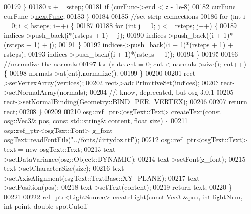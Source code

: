 \begin{DoxyCode}
00179             \}
00180             z += zstep;
00181             \textcolor{keywordflow}{if} (curFunc->\hyperlink{structbrtr_1_1_body_of_rotation_function_a46667ab72bfeddc305bf31fa359c8699}{end} < z - 1e-8)
00182                 curFunc = curFunc->\hyperlink{structbrtr_1_1_body_of_rotation_function_ad7df29eaeb2504928488691196cc06eb}{nextFunc};
00183         \}
00184 
00185         \textcolor{comment}{//set strip connections}
00186         \textcolor{keywordflow}{for} (\textcolor{keywordtype}{int} i = 0; i < hsteps; i++) \{
00187 
00188             \textcolor{keywordflow}{for} (\textcolor{keywordtype}{int} j = 0; j <= rsteps; j++) \{
00189                 indices->push\_back(i*(rsteps + 1) + j);
00190                 indices->push\_back((i + 1)*(rsteps + 1) + j);
00191             \}
00192             indices->push\_back((i + 1)*(rsteps + 1) + rsteps);
00193             indices->push\_back((i + 1)*(rsteps + 1));
00194         \}
00195 
00196         \textcolor{comment}{//normalize the normals}
00197         \textcolor{keywordflow}{for} (\textcolor{keyword}{auto} cnt = 0; cnt < normals->size(); cnt++) \{
00198             normals->at(cnt).normalize();
00199         \}
00200 
00201         rect->setVertexArray(vertices);
00202         rect->addPrimitiveSet(indices);
00203         rect->setNormalArray(normals);
00204         \textcolor{comment}{//i know, deprecated, but osg 3.0.1}
00205         rect->setNormalBinding(Geometry::BIND\_PER\_VERTEX);
00206 
00207         \textcolor{keywordflow}{return} rect;
00208     \}
00209 
\hypertarget{_util_functions_8cpp_source_l00210}{}\hyperlink{namespacebrtr_a4431de1c1fa2c1d42c4fb57c38aaa3ce}{00210}     osg::ref\_ptr<osgText::Text> \hyperlink{namespacebrtr_a4431de1c1fa2c1d42c4fb57c38aaa3ce}{createText}(\textcolor{keyword}{const} osg::Vec3& pos, \textcolor{keyword}{const} std::string& content, \textcolor{keywordtype}{
      float} size) \{
00211         osg::ref\_ptr<osgText::Font> g\_font = osgText::readFontFile(\textcolor{stringliteral}{"../fonts/dirtydoz.ttf"});
00212         osg::ref\_ptr<osgText::Text> text = \textcolor{keyword}{new} osgText::Text;
00213         text->setDataVariance(osg::Object::DYNAMIC);
00214         text->setFont(g\_font);
00215         text->setCharacterSize(size);
00216         text->setAxisAlignment(osgText::TextBase::XY\_PLANE);
00217         text->setPosition(pos);
00218         text->setText(content);
00219         \textcolor{keywordflow}{return} text;
00220     \}
00221 
\hypertarget{_util_functions_8cpp_source_l00222}{}\hyperlink{namespacebrtr_a73a88e86934887bd8750e4bbc0766b1f}{00222}     ref\_ptr<LightSource> \hyperlink{namespacebrtr_a73a88e86934887bd8750e4bbc0766b1f}{createLight}(\textcolor{keyword}{const} Vec3 &pos, \textcolor{keywordtype}{int} lightNum, \textcolor{keywordtype}{int} point, \textcolor{keywordtype}{double} spotCutoff

\end{DoxyCode}
